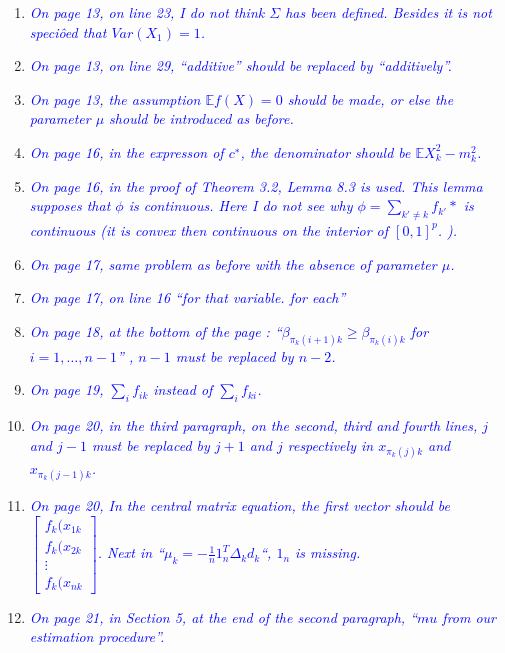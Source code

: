 \documentclass[pdftex,12pt]{article}
\def\E{{\mathbb E}}
\let\hat\widehat
\def\rc#1{{\it\textcolor{blue}{#1}}\smallskip}
\begin{document}
\begin{enumerate}



\item \rc{On page 13, on line 23, I do not think $\Sigma$ has been defined. Besides it
is not speciôed that $Var(X_1) = 1$.}

\item \rc{On page 13, on line 29, ``additive'' should be replaced by
``additively''.}

\item \rc{On page 13, the assumption $\E f(X) = 0$ should be made, or else the
parameter $\mu$ should be introduced as before.}

\item \rc{On page 16, in the expresson of $c^∗$, the
  denominator should be $\E X_k^2 −m_k^2$.}

\item \rc{On page 16, in the proof of Theorem 3.2, Lemma 8.3 is used. This
lemma supposes that $\phi$ is continuous. Here I do not see why $\phi =
\sum_{k'\neq k} f_{k'}*$ is continuous (it is convex then continuous on the interior of
$[0,1]^p$. ).}

\item \rc{On page 17, same problem as before with the absence of parameter $\mu$.}
\item \rc{On page 17, on line 16 ``for that variable. for each''}

\item \rc{On page 18, at the bottom of the page :
  ``$\beta_{\pi_k(i+1)k} 
\geq \beta_{\pi_k(i)k}$ for $i=1,\ldots, n-1$'' , $n−1$ must be replaced by $n−2$.}
\item \rc{On page 19, $\sum_{i} f_{ik}$ instead of $\sum_i
  f_{ki}$.}
\item \rc{On page 20, in the third paragraph, on the second, third and fourth
lines, $j$ and $j − 1$ must be replaced by $j + 1$ and $j$ respectively in
$x_{\pi_k(j)k}$ and $x_{\pi_k(j-1)k}$.}

\item \rc{On page 20, In the central matrix equation, the
  first vector should be
  $\left[\begin{matrix}f_k(x_{1k}\\ f_k(x_{2k}\\ \vdots\\f_k(x_{nk}\end{matrix}\right]$. Next
  in ``$\mu_k = -\frac{1}{n} 1_n^T \Delta_k d_k$``, $1_n$ is missing.}
\item \rc{On page 21, in Section 5, at the end of the
  second paragraph, ``$m\hat{}u$ from
our estimation procedure''.}


\end{enumerate}
\end{document}
